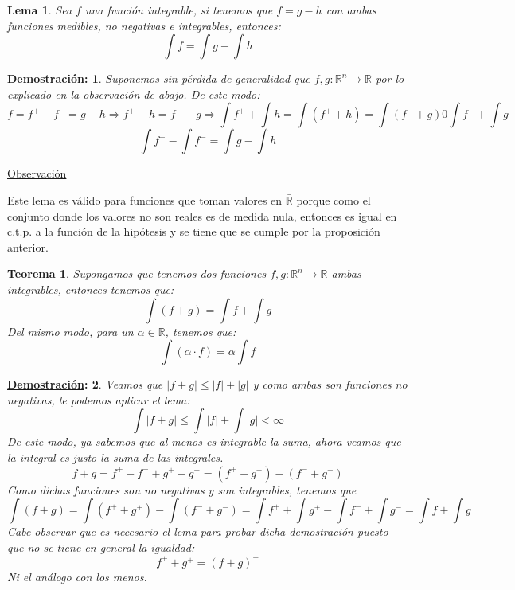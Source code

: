 \documentclass[10pt,a4paper,openright]{book}
\theoremstyle{break}
\newtheorem*{theo}{Teorema}
\newtheorem*{lema}{Lema}
\newtheorem*{demo}{\underline{Demostración}:}
\begin{document}
\begin{lema}
Sea $f$ una función integrable, si tenemos que $f = g- h$ con ambas funciones medibles, no negativas e integrables, entonces:
$$\int f = \int g - \int h$$
\end{lema}
\begin{demo}
Suponemos sin pérdida de generalidad que $f,g: \mathbb{R}^n\rightarrow \mathbb{R}$ por lo explicado en la observación de abajo. De este modo:
$$f = f^+ - f^- = g-h\Rightarrow f^+ + h = f^- + g \Rightarrow \int f^+ + \int h = \int (f^+ + h) = \int (f^- + g) 0 \int f^- + \int g$$
$$\int f^+ - \int f^- = \int g - \int h$$
\end{demo}

\underline{Observación}

Este lema es válido para funciones que toman valores en $\bar{\mathbb{R}}$ porque como el conjunto donde los valores no son reales es de medida nula, entonces es igual en c.t.p. a la función de la hipótesis y se tiene que se cumple por la proposición anterior.

\begin{theo}
Supongamos que tenemos dos funciones $f,g: \mathbb{R}^n \rightarrow \mathbb{R}$ ambas integrables, entonces tenemos que:
$$\int (f+g) = \int f + \int g$$
Del mismo modo, para un $\alpha \in \mathbb{R}$, tenemos que:
$$\int (\alpha \cdot f) = \alpha \int f$$
\end{theo}
\begin{demo}
Veamos que $|f+g|\leq |f| + |g|$ y como ambas son funciones no negativas, le podemos aplicar el lema:
$$\int |f+g| \leq \int |f| + \int |g| < \infty $$
De este modo, ya sabemos que al menos es integrable la suma, ahora veamos que la integral es justo la suma de las integrales.
$$f+ g = f^+ - f^- + g^+ - g^- = (f^+ + g^+) - (f^- + g^-)$$
Como dichas funciones son  no negativas y son integrables, tenemos que
$$\int (f+g) = \int (f^+ + g^+) - \int (f^- + g^- ) = \int f^+ + \int g^+ - \int f^- +\int g^-  = \int f + \int g$$
Cabe observar que es necesario el lema para probar dicha demostración puesto que no se tiene en general la igualdad:
$$f^+ + g^+ = (f+g)^+$$
Ni el análogo con los menos.
\end{demo}
\end{document}
